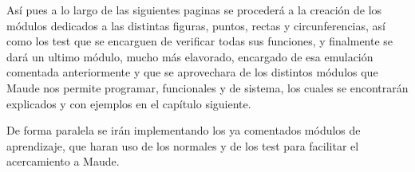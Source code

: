 Así pues a lo largo de las siguientes paginas se procederá a la creación de los módulos dedicados a las distintas figuras, puntos, rectas y circunferencias, así como los test que se encarguen de verificar todas sus funciones, y finalmente se dará un ultimo módulo, mucho más elavorado, encargado de esa emulación comentada anteriormente y que se aprovechara de los distintos módulos que Maude nos permite programar, funcionales y de sistema, los cuales se encontrarán explicados y con ejemplos en el capítulo siguiente.\par

De forma paralela se irán implementando los ya comentados módulos de aprendizaje, que haran uso de los normales y de los test para facilitar el acercamiento a Maude.\par







